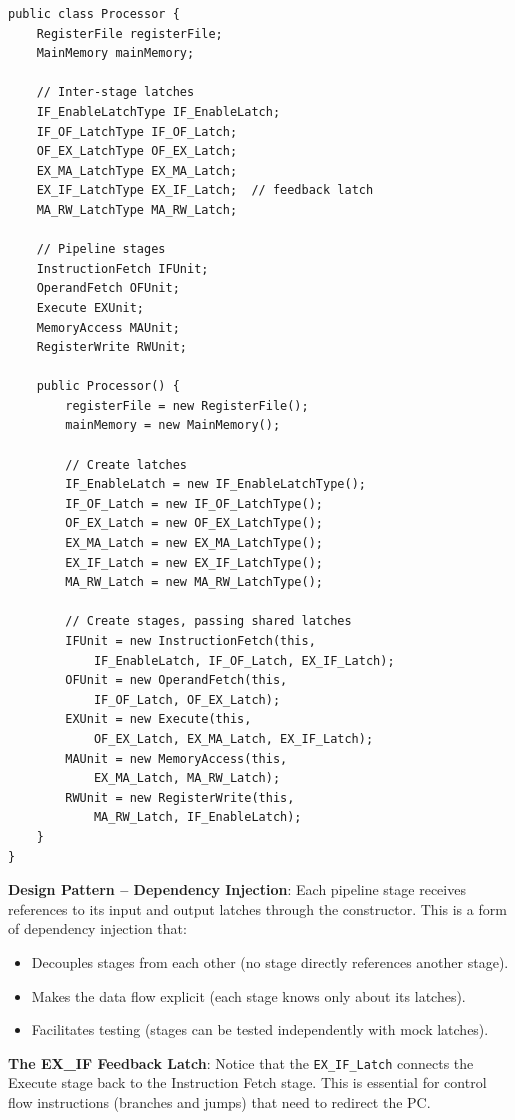 \documentclass[12pt,a4paper]{article}
\begin{document}
\begin{lstlisting}[style=javastyle, caption={Processor.java -- Constructor}]
public class Processor {
    RegisterFile registerFile;
    MainMemory mainMemory;

    // Inter-stage latches
    IF_EnableLatchType IF_EnableLatch;
    IF_OF_LatchType IF_OF_Latch;
    OF_EX_LatchType OF_EX_Latch;
    EX_MA_LatchType EX_MA_Latch;
    EX_IF_LatchType EX_IF_Latch;  // feedback latch
    MA_RW_LatchType MA_RW_Latch;

    // Pipeline stages
    InstructionFetch IFUnit;
    OperandFetch OFUnit;
    Execute EXUnit;
    MemoryAccess MAUnit;
    RegisterWrite RWUnit;

    public Processor() {
        registerFile = new RegisterFile();
        mainMemory = new MainMemory();

        // Create latches
        IF_EnableLatch = new IF_EnableLatchType();
        IF_OF_Latch = new IF_OF_LatchType();
        OF_EX_Latch = new OF_EX_LatchType();
        EX_MA_Latch = new EX_MA_LatchType();
        EX_IF_Latch = new EX_IF_LatchType();
        MA_RW_Latch = new MA_RW_LatchType();

        // Create stages, passing shared latches
        IFUnit = new InstructionFetch(this,
            IF_EnableLatch, IF_OF_Latch, EX_IF_Latch);
        OFUnit = new OperandFetch(this,
            IF_OF_Latch, OF_EX_Latch);
        EXUnit = new Execute(this,
            OF_EX_Latch, EX_MA_Latch, EX_IF_Latch);
        MAUnit = new MemoryAccess(this,
            EX_MA_Latch, MA_RW_Latch);
        RWUnit = new RegisterWrite(this,
            MA_RW_Latch, IF_EnableLatch);
    }
}
\end{lstlisting}

\textbf{Design Pattern -- Dependency Injection}: Each pipeline stage receives references to its input and output latches through the constructor. This is a form of dependency injection that:
\begin{itemize}
    \item Decouples stages from each other (no stage directly references another stage).
    \item Makes the data flow explicit (each stage knows only about its latches).
    \item Facilitates testing (stages can be tested independently with mock latches).
\end{itemize}

\textbf{The EX\_IF Feedback Latch}: Notice that the \texttt{EX\_IF\_Latch} connects the Execute stage back to the Instruction Fetch stage. This is essential for control flow instructions (branches and jumps) that need to redirect the PC.
\end{document}
